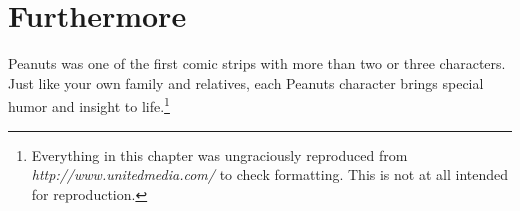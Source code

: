 \section{Furthermore}

Peanuts was one of the first comic strips with more than two or three characters. Just like your own family and relatives, each Peanuts character brings special humor and insight to life.\footnote{Everything in this chapter was ungraciously reproduced from {\em http://www.unitedmedia.com/} to check formatting.  This is not at all intended for reproduction.}
